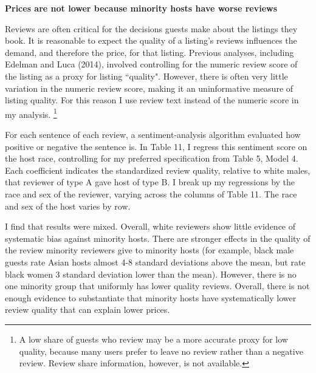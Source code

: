 \textbf{Prices are not lower because minority hosts have worse reviews} 

Reviews are often critical for the decisions guests make about the listings they book. It is reasonable to expect the quality of a listing's reviews influences the demand, and therefore the price, for that listing. Previous analyses, including Edelman and Luca (2014), involved controlling for the numeric review score of the listing as a proxy for listing ``quality". However, there is often very little variation in the numeric review score, making it an uninformative measure of listing quality. For this reason I use review text instead of the numeric score in my analysis.%
	\footnote{A low share of guests who review may be a more accurate proxy for low quality, because many users prefer to leave no review rather than a negative review. Review share information, however, is not available.} 

For each sentence of each review, a sentiment-analysis algorithm evaluated how positive or negative the sentence is. In Table 11, I regress this sentiment score on the host race, controlling for my preferred specification from Table 5, Model 4. Each coefficient indicates the standardized review quality, relative to white males, that reviewer of type A gave host of type B. I break up my regressions by the race and sex of the reviewer, varying across the columns of Table 11. The race and sex of the host varies by row. 


I find that results were mixed. Overall, white reviewers show little evidence of systematic bias against minority hosts. There are stronger effects in the quality of the review minority reviewers give to minority hosts (for example, black male guests rate Asian hosts almost 4-8 standard deviations above the mean, but rate black women 3 standard deviation lower than the mean). However, there is no one minority group that uniformly has lower quality reviews. Overall, there is not enough evidence to substantiate that minority hosts have systematically lower review quality that can explain lower prices. 

